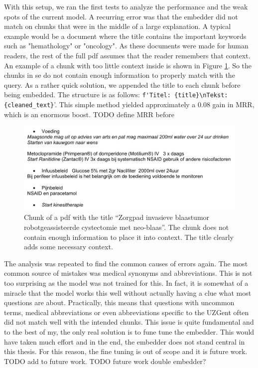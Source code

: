 With this setup, we ran the first tests to analyze the performance and the weak spots of the current model. A recurring error was that the embedder did not match on chunks that were in the middle of a large explanation. A typical example would be a document where the title contains the important keywords such as "hemathology" or "oncology". As these documents were made for human readers, the rest of the full pdf assumes that the reader remembers that context. An example of a chunk with too little context inside is shown in Figure \ref{fig:out_of_context_zenya_doc}. So the chunks in se do not contain enough information to properly match with the query. As a rather quick solution, we appended the title to each chunk before being embedded. The structure is as follows: \verb|f'Titel: {title}\nTekst: {cleaned_text}|'. This simple method yielded approximately a 0.08 gain in MRR, which is an enormous boost.
TODO define MRR before

\begin{figure}[h]
    \centerline{\includegraphics[width=1\linewidth]{fig/out_of_context_zenya_doc.png}}
    \caption{Chunk of a pdf with the title ``Zorgpad invasieve blaastumor robotgeassisteerde cystectomie met neo-blaas''. The chunk does not contain enough information to place it into context. The title clearly adds some necessary context.}
    \label{fig:out_of_context_zenya_doc}
\end{figure}

The analysis was repeated to find the common causes of errors again. The most common source of mistakes was medical synonyms and abbreviations. This is not too surprising as the model was not trained for this. In fact, it is somewhat of a miracle that the model works this well without actually having a clue what most questions are about. Practically, this means that questions with uncommon terms, medical abbreviations or even abbreviations specific to the UZGent often did not match well with the intended chunks. This issue is quite fundamental and to the best of my, the only real solution is to fune tune the embedder. This would have taken much effort and in the end, the embedder does not stand central in this thesis. For this reason, the fine tuning is out of scope and it is future work. TODO add to future work. TODO future work double embedder?

